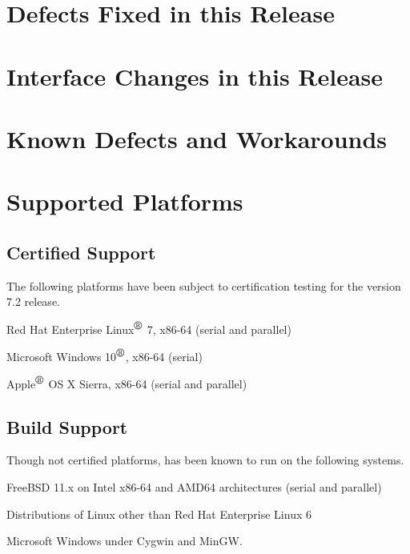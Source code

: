 \documentclass[letterpaper]{scrartcl}
\begin{document}
\newpage
\section{Defects Fixed in this Release}



\newpage
\section{Interface Changes in this Release}



\newpage
\section{Known Defects and Workarounds}



\newpage
\section{Supported Platforms}
\subsection*{Certified Support}
The following platforms have been subject to certification testing for the
\Xyce{} version 7.2 release.
\begin{XyceItemize}
  \item Red Hat Enterprise Linux${}^{\mbox{\textregistered}}$ 7, x86-64 (serial and parallel)
  \item Microsoft Windows 10${}^{\mbox{\textregistered}}$, x86-64 (serial)
  \item Apple${}^{\mbox{\textregistered}}$ OS X Sierra, x86-64 (serial and parallel)
\end{XyceItemize}

\subsection*{Build Support}
Though not certified platforms, \Xyce{} has been known to run on the following
systems.
\begin{XyceItemize}
  \item FreeBSD 11.x on Intel x86-64 and AMD64 architectures (serial
    and parallel)
  \item Distributions of Linux other than Red Hat Enterprise Linux 6
  \item Microsoft Windows under Cygwin and MinGW.
\end{XyceItemize}
\end{document}
